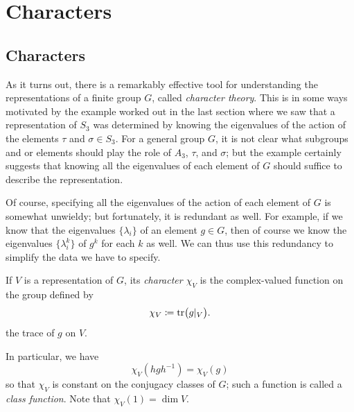 \section{Characters}
\subsection{Characters}
As it turns out, there is a remarkably effective tool for understanding the
representations of a finite group $G$, called \emph{character theory}. This
is in some ways motivated by the example worked out in the last section
where we saw that a representation of $S_3$ was determined by knowing the
eigenvalues of the action of the elements $\tau$ and $\sigma\in S_3$. For a
general group $G$, it is not clear what subgroups and or elements should
play the role of $A_3$, $\tau$, and $\sigma$; but the example certainly
suggests that knowing all the eigenvalues of each element of $G$ should
suffice to describe the representation.

Of course, specifying all the eigenvalues of the action of each element of
$G$ is somewhat unwieldy; but fortunately, it is redundant as well. For
example, if we know that the eigenvalues $\{\lambda_i\}$ of an element
$g\in G$, then of course we know the eigenvalues $\{\lambda_i^k\}$ of $g^k$
for each $k$ as well. We can thus use this redundancy to simplify the data
we have to specify.

\begin{definition}
If $V$ is a representation of $G$, its \emph{character $\chi_V$} is the
complex-valued function on the group defined by
\[
\chi_V\coloneq\operatorname{tr}\bigr(g|_V\bigl).
\]
the trace of $g$ on $V$.
\end{definition}

In particular, we have
\[
\chi_V(hgh^{-1})=\chi_V(g)
\]
so that $\chi_V$ is constant on the conjugacy classes of $G$; such a
function is called a \emph{class function}. Note that $\chi_V(1)=\dim V$.

